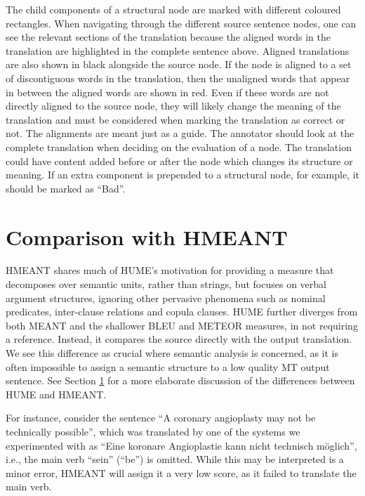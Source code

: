 \documentclass[11pt]{article}
\newcommand{\secref}[1]{Section \ref{#1}}
\begin{document}
 The child components of a structural node are marked with different coloured rectangles. When navigating through the different source sentence nodes, one can see the relevant sections of the translation because the aligned words in the translation are highlighted in the complete sentence above. Aligned translations are also shown in black alongside the source node. If the node is aligned to a set of discontiguous words in the translation, then the unaligned words that appear in between the aligned words are shown in red. Even if these words are not directly aligned to the source node, they 
will likely change the meaning of the translation and must be considered when marking 
the translation as correct or not. The alignments are meant just as a guide. The annotator should  look at the complete translation when deciding on the evaluation of a node. The translation could have content added before or after the node which changes its
 structure or meaning. If an extra component is prepended to a structural node, for example, it should be marked as ``Bad''.




\section{Comparison with HMEANT}\label{sec:hmeant_comp}

HMEANT shares much of HUME's motivation for providing a
measure that decomposes over semantic units, rather than strings, but focuses on verbal
argument structures, ignoring other pervasive phenomena such as nominal predicates, inter-clause
relations and copula clauses.
HUME further diverges from both MEANT and the shallower BLEU and
METEOR measures, in not requiring a reference.
Instead, it compares the source directly with the output
translation. We see this difference as crucial where semantic analysis is concerned, as it
is often impossible to assign a semantic structure to a low quality MT output sentence.
See \secref{sec:hmeant_comp} for a more elaborate discussion of the differences between HUME
and HMEANT.


For instance, consider the sentence ``A coronary angioplasty may not be technically possible'',
which was translated by one of the systems we experimented with as
``Eine koronare Angioplastie kann nicht technisch m{\"o}glich'', i.e., the main verb ``sein'' (``be'') is omitted.
While this may be interpreted is a minor error, HMEANT will assign it a very low score, as it failed to
translate the main verb. 
\end{document}
